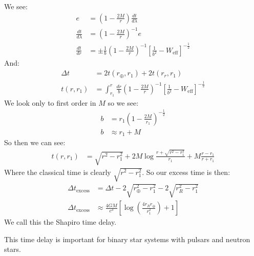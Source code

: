 We see:
\begin{align*}
	e&= \left(1- \frac{2M}{r}\right)\frac{dt}{d\lambda} \\
	\frac{dt}{d\lambda} &= \left(1 - \frac{2M}{r}\right)^{-1} e \\
	\frac{dt}{dr} &= \pm \frac{1}{b}\left(1-\frac{2M}{r}\right)^{-1} \left[ \frac{1}{b^2} - W_\text{eff}\right]^{-\frac{1}{2}}
\end{align*}
And:
\begin{align*}
	\Delta t &= 2t(r_\oplus,r_1) + 2t(r_r,r_1) \\
	t(r,r_1) &=\int_{r_1}^r \frac{dr}{b}\left(1-\frac{2M}{r}\right)^{-1} \left[ \frac{1}{b^2} - W_\text{eff}\right]^{-\frac{1}{2}}
\end{align*}
We look only to first order in $M$ so we see:
\begin{align*}
	b &= r_1\left(1 - \frac{2M}{r_1}\right)^{-\frac{1}{2}} \\
	b &\approx r_1 + M
\end{align*}
So then we can see:
\begin{align*}
	t(r,r_1) &= \sqrt{r^2 - r_1^2} + 2M \log\frac{r+ \sqrt{r^2 - r_1^2}}{r_1} + M \frac{r-r_1}{r+r_1}
\end{align*}
Where the classical time is clearly $\sqrt{r^2 - r_1^2}$. So our excess time is then:
\begin{align*}
	\Delta t_\text{excess} &= \Delta t - 2\sqrt{r_\oplus^2 - r_1^2} - 2\sqrt{r_R^2  -r_1^2} \\
	\Delta t_\text{excess} &\approx \frac{4GM}{c^3} \left[\log\left(\frac{4r_Rr_\oplus}{r_1^2}\right) + 1\right]
\end{align*}
We call this the Shapiro time delay.

This time delay is important for binary star systems with pulsars and neutron stars.

